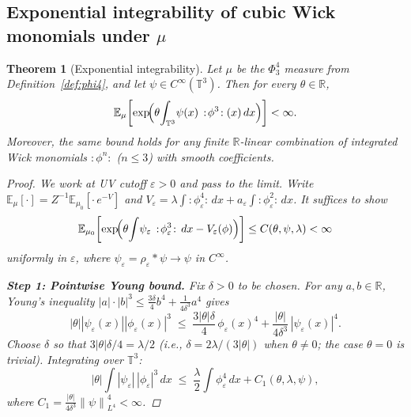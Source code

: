 \documentclass[11pt,a4paper]{article}
\newtheorem{theorem}{Theorem}[section]
\theoremstyle{definition}
\newcommand{\T}{\mathbb{T}}
\newcommand{\R}{\mathbb{R}}
\newcommand{\E}{\mathbb{E}}
\newcommand{\norm}[1]{\left\|#1\right\|}
\newcommand{\wick}[1]{:\!#1\!:}
\begin{document}
\subsection{Exponential integrability of cubic Wick monomials under $\mu$}

\begin{theorem}[Exponential integrability]\label{thm:expint}
Let $\mu$ be the $\Phi^4_3$ measure from Definition~\ref{def:phi4}, and let $\psi\in C^\infty(\T^3)$.
Then for every $\theta\in\R$,
\begin{equation}\label{eq:expint}
\E_\mu\!\left[\exp\!\Bigl(\theta\!\int_{\T^3}\!\psi(x)\,\wick{\phi^3}(x)\,dx\Bigr)\right] < \infty.
\end{equation}
Moreover, the same bound holds for any finite $\R$-linear combination of integrated Wick monomials $\wick{\phi^n}$ ($n\le 3$) with smooth coefficients.

\begin{proof}
We work at UV cutoff $\varepsilon>0$ and pass to the limit.
Write $\E_\mu[\cdot] = Z^{-1}\E_{\mu_0}[\cdot\,e^{-V}]$ and $V_\varepsilon = \lambda\int\wick{\phi_\varepsilon^4}\,dx + a_\varepsilon\int\wick{\phi_\varepsilon^2}\,dx$.  It suffices to show
\begin{equation}\label{eq:uniform_bound}
\E_{\mu_0}\!\left[\exp\!\Bigl(\theta\!\int\!\psi_\varepsilon\,\wick{\phi_\varepsilon^3}\,dx - V_\varepsilon(\phi)\Bigr)\right] \le C(\theta,\psi,\lambda) < \infty
\end{equation}
uniformly in $\varepsilon$, where $\psi_\varepsilon=\rho_\varepsilon*\psi\to\psi$ in $C^\infty$.

\medskip
\noindent\textbf{Step 1: Pointwise Young bound.}
Fix $\delta>0$ to be chosen.  For any $a,b\in\R$, Young's inequality $|a|\cdot|b|^3\le\tfrac{3\delta}{4}b^4 + \tfrac{1}{4\delta^3}a^4$ gives
\[
|\theta||\psi_\varepsilon(x)||\phi_\varepsilon(x)|^3
\;\le\;
\frac{3|\theta|\delta}{4}\,\phi_\varepsilon(x)^4
+
\frac{|\theta|}{4\delta^3}\,|\psi_\varepsilon(x)|^4.
\]
Choose $\delta$ so that $3|\theta|\delta/4 = \lambda/2$ (i.e., $\delta = 2\lambda/(3|\theta|)$ when $\theta\ne 0$; the case $\theta=0$ is trivial).  Integrating over $\T^3$:
\begin{equation}\label{eq:young}
|\theta|\!\int|\psi_\varepsilon|\,|\phi_\varepsilon|^3\,dx
\;\le\;
\frac{\lambda}{2}\!\int\phi_\varepsilon^4\,dx + C_1(\theta,\lambda,\psi),
\end{equation}
where $C_1 = \frac{|\theta|}{4\delta^3}\norm{\psi}_{L^4}^4 < \infty$.


\end{proof}
\end{theorem}
\end{document}
